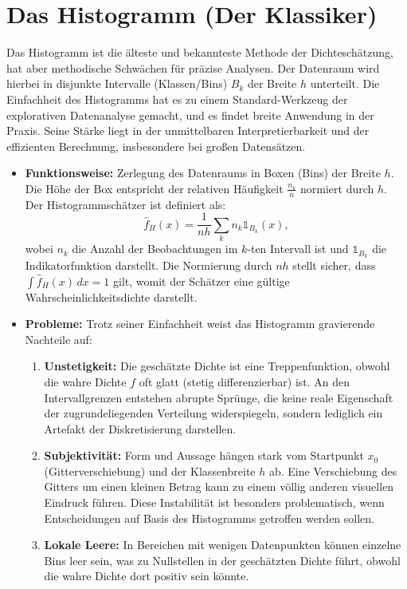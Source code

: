 \documentclass[a4paper, 11pt]{scrartcl}
\begin{document}
\section{Das Histogramm (Der Klassiker)}

Das Histogramm ist die älteste und bekannteste Methode der Dichteschätzung, hat aber methodische Schwächen für präzise Analysen. Der Datenraum wird hierbei in disjunkte Intervalle (Klassen/Bins) $B_k$ der Breite $h$ unterteilt. Die Einfachheit des Histogramms hat es zu einem Standard-Werkzeug der explorativen Datenanalyse gemacht, und es findet breite Anwendung in der Praxis. Seine Stärke liegt in der unmittelbaren Interpretierbarkeit und der effizienten Berechnung, insbesondere bei großen Datensätzen.

\begin{itemize}
	\item \textbf{Funktionsweise:} Zerlegung des Datenraums in Boxen (Bins) der Breite $h$. Die Höhe der Box entspricht der relativen Häufigkeit $\frac{n_k}{n}$ normiert durch $h$. Der Histogrammschätzer ist definiert als:
	      \begin{equation}
	      	\hat{f}_H(x) = \frac{1}{nh} \sum_{k} n_k \mathds{1}_{B_k}(x),
	      \end{equation}
	      wobei $n_k$ die Anzahl der Beobachtungen im $k$-ten Intervall ist und $\mathds{1}_{B_k}$ die Indikatorfunktion darstellt. Die Normierung durch $nh$ stellt sicher, dass $\int \hat{f}_H(x) \, dx = 1$ gilt, womit der Schätzer eine gültige Wahrscheinlichkeitsdichte darstellt.
	      
	\item \textbf{Probleme:} Trotz seiner Einfachheit weist das Histogramm gravierende Nachteile auf:
	      \begin{enumerate}
	      	\item \textbf{Unstetigkeit:} Die geschätzte Dichte ist eine Treppenfunktion, obwohl die wahre Dichte $f$ oft glatt (stetig differenzierbar) ist. An den Intervallgrenzen entstehen abrupte Sprünge, die keine reale Eigenschaft der zugrundeliegenden Verteilung widerspiegeln, sondern lediglich ein Artefakt der Diskretisierung darstellen.
	      	\item \textbf{Subjektivität:} Form und Aussage hängen stark vom Startpunkt $x_0$ (Gitterverschiebung) und der Klassenbreite $h$ ab. Eine Verschiebung des Gitters um einen kleinen Betrag kann zu einem völlig anderen visuellen Eindruck führen. Diese Instabilität ist besonders problematisch, wenn Entscheidungen auf Basis des Histogramms getroffen werden sollen.
	      	\item \textbf{Lokale Leere:} In Bereichen mit wenigen Datenpunkten können einzelne Bins leer sein, was zu Nullstellen in der geschätzten Dichte führt, obwohl die wahre Dichte dort positiv sein könnte.
	      \end{enumerate}
	      

\end{itemize}
\end{document}
